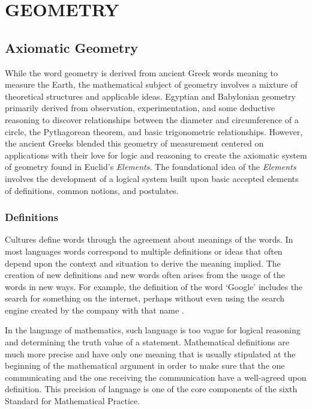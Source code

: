 \documentclass[
]{book}
\let\stdsection\section
\renewcommand\section{\newpage\stdsection}
\theoremstyle{definition}
\theoremstyle{definition}
\theoremstyle{definition}
\theoremstyle{definition}
\theoremstyle{remark}
\begin{document}
\hypertarget{part-geometry}{%
\part{GEOMETRY}\label{part-geometry}}

\hypertarget{constructions}{%
\chapter{Axiomatic Geometry}\label{constructions}}

While the word geometry is derived from ancient Greek words meaning to measure the Earth, the mathematical subject of geometry involves a mixture of theoretical structures and applicable ideas. Egyptian and Babylonian geometry primarily derived from observation, experimentation, and some deductive reasoning to discover relationships between the diameter and circumference of a circle, the Pythagorean theorem, and basic trigonometric relationships. However, the ancient Greeks blended this geometry of measurement centered on applications with their love for logic and reasoning to create the axiomatic system of geometry found in Euclid's \emph{Elements}. The foundational idea of the \emph{Elements} involves the development of a logical system built upon basic accepted elements of definitions, common notions, and postulates.

\hypertarget{definitions-1}{%
\section{Definitions}\label{definitions-1}}

Cultures define words through the agreement about meanings of the words. In most languages words correspond to multiple definitions or ideas that often depend upon the context and situation to derive the meaning implied. The creation of new definitions and new words often arises from the usage of the words in new ways. For example, the definition of the word `Google' includes the search for something on the internet, perhaps without even using the search engine created by the company with that name \citep{Edwards2008}.

In the language of mathematics, such language is too vague for logical reasoning and determining the truth value of a statement. Mathematical definitions are much more precise and have only one meaning that is usually stipulated at the beginning of the mathematical argument in order to make sure that the one communicating and the one receiving the communication have a well-agreed upon definition. This precision of language is one of the core components of the sixth Standard for Mathematical Practice.
\end{document}
